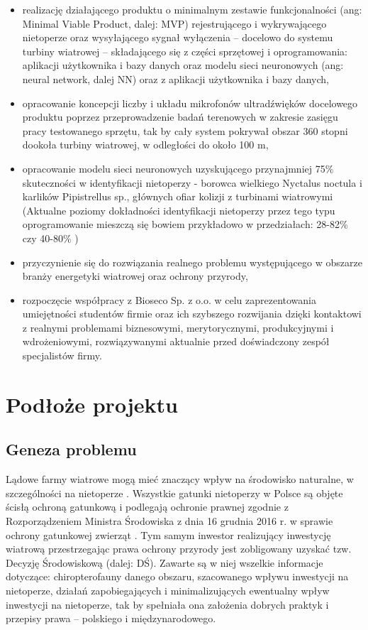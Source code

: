\documentclass{sprz}
\begin{document}
\begin{itemize}
  \item{realizację działającego produktu o minimalnym zestawie funkcjonalności (ang: Minimal Viable Product, dalej: MVP) rejestrującego i wykrywającego nietoperze oraz wysyłającego sygnał wyłączenia – docelowo do systemu turbiny wiatrowej – składającego się z części sprzętowej i oprogramowania: aplikacji użytkownika i bazy danych oraz modelu sieci neuronowych (ang: neural network, dalej NN) oraz z aplikacji użytkownika i bazy danych,}
  \item{opracowanie koncepcji liczby i układu mikrofonów ultradźwięków docelowego produktu poprzez przeprowadzenie badań terenowych w zakresie zasięgu pracy testowanego sprzętu, tak by cały system pokrywał obszar 360 stopni dookoła turbiny wiatrowej, w odległości do około 100 m,}
  \item{opracowanie modelu sieci neuronowych uzyskującego przynajmniej 75\% skuteczności w identyfikacji nietoperzy - borowca wielkiego Nyctalus noctula i karlików Pipistrellus sp., głównych ofiar kolizji z turbinami wiatrowymi (Aktualne poziomy dokładności identyfikacji nietoperzy przez tego typu oprogramowanie mieszczą się bowiem przykładowo w przedziałach: 28-82\% \cite{kaleidoscope-accuracy} czy 40-80\% \cite{kaleidoscope-bias})}
  \item{przyczynienie się do rozwiązania realnego problemu występującego w obszarze branży energetyki wiatrowej oraz ochrony przyrody,}
  \item{rozpoczęcie współpracy z Bioseco Sp. z o.o. w celu zaprezentowania umiejętności studentów firmie oraz ich szybszego rozwijania dzięki kontaktowi z realnymi problemami biznesowymi, merytorycznymi, produkcyjnymi i wdrożeniowymi, rozwiązywanymi aktualnie przed doświadczony zespół specjalistów firmy.}
  \end{itemize}
  
\chapter{Podłoże projektu}

\section{Geneza problemu}

Lądowe farmy wiatrowe mogą mieć znaczący wpływ na środowisko naturalne, w szczególności na nietoperze \cite{Wytyczne}. Wszystkie gatunki nietoperzy w Polsce są objęte ścisłą ochroną gatunkową i podlegają ochronie prawnej zgodnie z Rozporządzeniem Ministra Środowiska z dnia 16 grudnia 2016 r. w sprawie ochrony gatunkowej zwierząt \cite{Rozporządzenie}. Tym samym inwestor realizujący inwestycję wiatrową przestrzegając prawa ochrony przyrody jest zobligowany uzyskać tzw. Decyzję Środowiskową (dalej: DŚ). Zawarte są w niej wszelkie informacje dotyczące: chiropterofauny danego obszaru, szacowanego wpływu inwestycji na nietoperze, działań zapobiegających i minimalizujących ewentualny wpływ inwestycji na nietoperze, tak by spełniała ona założenia dobrych praktyk i przepisy prawa – polskiego i międzynarodowego. 
\end{document}
